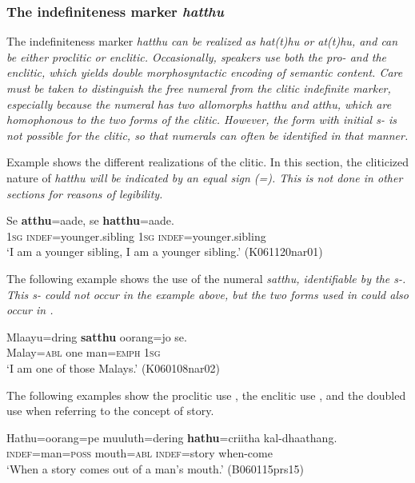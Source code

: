 \subsubsection{The indefiniteness marker \em hatthu\em}
The  indefiniteness marker \em hatthu \em can be realized as \em hat(t)hu \em or \em at(t)hu, \em and can be either proclitic or enclitic. Occasionally, speakers use both the pro- and the enclitic, which yields double morphosyntactic encoding of semantic content. Care must be taken to distinguish the free numeral   from the clitic indefinite marker, especially because the numeral has two allomorphs  \em hatthu \em and \em atthu\em, which are homophonous to the two forms of the clitic. However, the form with initial \em s- \em is not possible for the clitic, so that numerals can often be identified in that manner.

Example   shows the different realizations of the clitic. In this section, the cliticized nature of \em hatthu \em will be indicated by an equal sign (=). This is not done in other sections for reasons of legibility.


\ea \label{ex:hatthu:atthuhatthu}
\gll Se \textbf{atthu}=aade,  se \textbf{hatthu}=aade. \\
     1\textsc{sg} \textsc{indef}=younger.sibling 1\textsc{sg} \textsc{indef}=younger.sibling  \\
    `I am a younger sibling, I am a younger sibling.'  (K061120nar01)
\z


The following example shows the use of the numeral \em satthu, \em identifiable by the \em s-\em. This \em s- \em could not occur in the example above, but the two forms used in  could  also occur in .


\ea \label{ex:hatthu:satthu}
\gll Mlaayu=dring   \textbf{satthu} oorang=jo    se. \\
      Malay=\textsc{abl} one man=\textsc{emph} 1\textsc{sg} \\
    `I am one of those Malays.'  (K060108nar02)
\z


The following examples show the proclitic use , the enclitic use , and the doubled use  when referring to the concept of story.


\ea \label{ex:hatthu:proclitic}
\gll Hathu=oorang=pe muuluth=dering \textbf{hathu}=criitha kal-dhaathang. \\
     \textsc{indef}=man=\textsc{poss} mouth=\textsc{abl} \textsc{indef}=story when-come  \\
    `When a story comes out of a man's mouth.'  (B060115prs15)
\z




